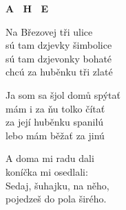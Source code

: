 
\re{}
{\footnotesize \textbf{A \ H \ E}}

\ve{}
Na Březovej tři ulice\\
sú tam dzjevky šimbolice\\
sú tam dzjevonky bohaté\\
chcú za huběnku tři zlaté

\ve{}
Ja som sa šjol domů spýtať\\
mám i za ňu tolko čítať\\
za její huběnku spanilú\\
lebo mám běžať za jinú

\ve{}
A doma mi radu dali\\
koníčka mi osedlali:\\
Sedaj, šuhajku, na něho,\\
pojedzeš do pola širého.

\esong{}